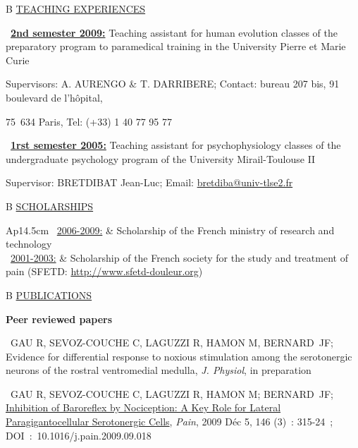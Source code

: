 \documentclass[a4paper,12pt,oneside]{letter}
\begin{document}
{\begin{tabular}{B}
\underline{TEACHING EXPERIENCES}
\end{tabular}

\textbullet~\underline{\textbf{2nd semester 2009:}} 	Teaching assistant for human evolution classes of the preparatory program to paramedical training in the University Pierre et Marie Curie

Supervisors: A. AURENGO \& T. DARRIBERE; Contact: bureau 207 bis, 91 boulevard de l’hôpital, 

75 634 Paris, Tel: (+33) 1 40 77 95 77

\textbullet~\underline{\textbf{1rst semester 2005:}} 	Teaching assistant for psychophysiology classes of the undergraduate psychology program of the University Mirail-Toulouse II

Supervisor: BRETDIBAT Jean-Luc; Email: \href{mailto:bretdiba@univ-tlse2.fr}{bretdiba@univ-tlse2.fr}

\begin{tabular}{B}
\underline{SCHOLARSHIPS}
\end{tabular}

\begin{tabular}{Ap{14.5cm}}
\textbullet~\underline{2006-2009:} & Scholarship of the French ministry of research and technology \\
\textbullet~\underline{2001-2003:} & Scholarship of the French society for the study and treatment of pain \newline
				     (SFETD: \url{http://www.sfetd-douleur.org})
\end{tabular}

\begin{tabular}{B}
\underline{PUBLICATIONS}
\end{tabular}

\begin{center}
\Large\textbf{Peer reviewed papers}
\end{center}

\textbullet~GAU R, SEVOZ-COUCHE C, LAGUZZI R, HAMON M, BERNARD JF; Evidence for differential response to noxious stimulation among the serotonergic neurons of the rostral ventromedial medulla, \textit{J. Physiol}, in preparation

\textbullet~GAU R, SEVOZ-COUCHE C, LAGUZZI R, HAMON M; BERNARD JF; \href{http://www.painjournalonline.com/article/S0304-3959\%2809\%2900554-5/abstract}{Inhibition of Baroreflex by Nociception: A Key Role for Lateral Paragigantocellular Serotonergic Cells},\textit{ Pain}, 2009 Déc 5, 146 (3) : 315-24 ; DOI : 10.1016/j.pain.2009.09.018

}
\end{document}
